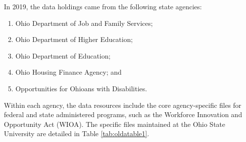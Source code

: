 \documentclass[
]{WileySix}
\providecommand{\tightlist}{%
  \setlength{\itemsep}{0pt}\setlength{\parskip}{0pt}}
\begin{document}
In 2019, the data holdings came from the following state agencies:

\begin{enumerate}
\def\labelenumi{\arabic{enumi}.}
\tightlist
\item
  Ohio Department of Job and Family Services;
\item
  Ohio Department of Higher Education;
\item
  Ohio Department of Education;
\item
  Ohio Housing Finance Agency; and
\item
  Opportunities for Ohioans with Disabilities.
\end{enumerate}

Within each agency, the data resources include the core agency-specific files for federal and state administered programs, such as the Workforce Innovation and Opportunity Act (WIOA). The specific files maintained at the Ohio State University are detailed in Table \ref{tab:oldatable1}.
\end{document}

